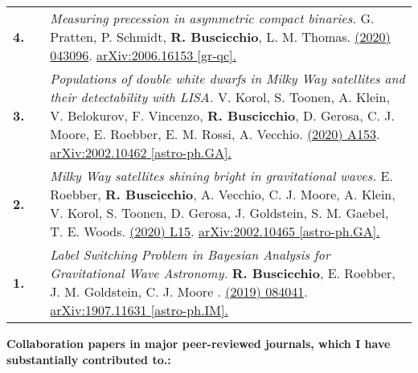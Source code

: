 {\begin{longtable}{rp{0.3cm}p{15.8cm}}
%
\textbf{4.} & & \textit{Measuring precession in asymmetric compact binaries.}
\newline{}
G. Pratten, P. Schmidt, \textbf{R. Buscicchio}, L. M. Thomas.
\newline{}
\href{https://journals.aps.org/prresearch/abstract/10.1103/PhysRevResearch.2.043096}{\prr 2 (2020) 043096}. \href{https://arxiv.org/abs/2006.16153}{arXiv:2006.16153 [gr-qc].}
\vspace{0.09cm}\\
%
\textbf{3.} & & \textit{Populations of double white dwarfs in Milky Way satellites and their detectability with LISA.}
\newline{}
V. Korol, S. Toonen, A. Klein, V. Belokurov, F. Vincenzo, \textbf{R. Buscicchio}, D. Gerosa, C. J. Moore, E. Roebber, E. M. Rossi, A. Vecchio.
\newline{}
\href{https://www.aanda.org/articles/aa/abs/2020/06/aa37764-20/aa37764-20.html}{\aap 638 (2020) A153}. \href{https://arxiv.org/abs/2002.10462}{arXiv:2002.10462 [astro-ph.GA].}
\vspace{0.09cm}\\
%
\textbf{2.} & & \textit{Milky Way satellites shining bright in gravitational waves.}
\newline{}
E. Roebber, \textbf{R. Buscicchio}, A. Vecchio, C. J. Moore, A. Klein, V. Korol, S. Toonen, D. Gerosa, J. Goldstein, S. M. Gaebel, T. E. Woods.
\newline{}
\href{https://iopscience.iop.org/article/10.3847/2041-8213/ab8ac9}{\apjl 894 (2020) L15}. \href{https://arxiv.org/abs/2002.10465}{arXiv:2002.10465 [astro-ph.GA].}
\vspace{0.09cm}\\
%
\textbf{1.} & & \textit{Label Switching Problem in Bayesian Analysis for Gravitational Wave Astronomy.}
\newline{}
\textbf{R. Buscicchio}, E. Roebber, J. M. Goldstein, C. J. Moore .
\newline{}
\href{https://journals.aps.org/prd/abstract/10.1103/PhysRevD.100.084041}{\prd 100 (2019) 084041}. \href{https://arxiv.org/abs/1907.11631}{arXiv:1907.11631 [astro-ph.IM].}
\vspace{0.09cm}\\
%
\end{longtable} }
\textcolor{color1}{\textbf{Collaboration papers in major peer-reviewed journals, which I have substantially contributed to.:}}
\vspace{-0.5cm}

